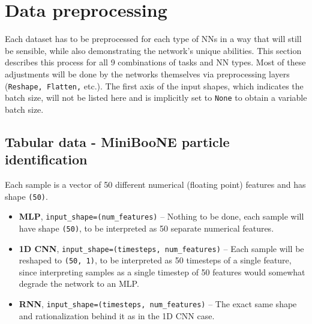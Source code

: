 \section{Data preprocessing}
\label{data-preprocessing}
Each dataset has to be preprocessed for each type of NNs in a way that will still be sensible, while also 
demonstrating
the network's unique abilities. This section describes this process for all 9 combinations of tasks and NN types.
Most of these adjustments will be done by the networks themselves via preprocessing layers (\texttt{Reshape, Flatten,} etc.). The first axis of the input shapes, which indicates the batch size, will not be listed here and is implicitly
set to \texttt{None} to obtain a variable batch size.


\subsection{Tabular data - MiniBooNE particle identification}
\label{preprocessing-tabular}
Each sample is a vector of 50 different numerical (floating point) features and has shape \texttt{(50)}.
\begin{itemize}
    \item \textbf{MLP}, \texttt{input\_shape=(num\_features)} -- Nothing to be done, each sample will have shape
    \texttt{(50)}, to be interpreted as 50 separate numerical features.
    \item \textbf{1D CNN}, \texttt{input\_shape=(timesteps, num\_features)} -- Each sample will be reshaped to
    \texttt{(50, 1)}, to be interpreted as 50 timesteps of a single feature, since interpreting samples
    as a single timestep of 50 features would somewhat degrade the network to an MLP.
    \item \textbf{RNN}, \texttt{input\_shape=(timesteps, num\_features)} -- The exact same shape and rationalization
    behind it as in the 1D CNN case.
\end{itemize}


